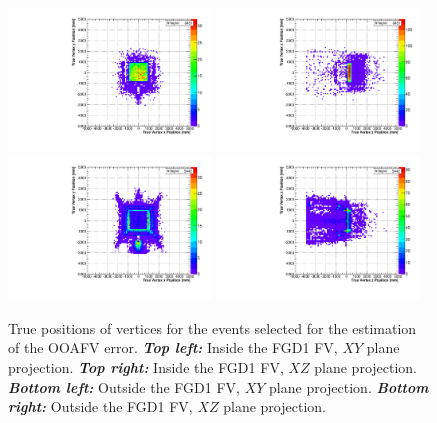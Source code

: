 \begin{figure}[ht]
  \center
  \includegraphics[width=0.48\textwidth]{T2K-TN-313/images/systematics/xy_infv_true.pdf}
  \includegraphics[width=0.48\textwidth]{T2K-TN-313/images/systematics/xz_infv_true.pdf} \\
  \includegraphics[width=0.48\textwidth]{T2K-TN-313/images/systematics/xy_oofv_true.pdf}
  \includegraphics[width=0.48\textwidth]{T2K-TN-313/images/systematics/xz_oofv_true.pdf} \\
  \caption[True positions of the events selected for the estimation of the OOAFV error]{True
    positions of vertices for the events selected for the estimation of the \Gls{OOAFV} error.
    \textbf{\textit{Top left:}} Inside the \Gls{FGD}1 \Gls{FV}, $XY$ plane projection.
    \textbf{\textit{Top right:}} Inside the \Gls{FGD}1 \Gls{FV}, $XZ$ plane projection.
    \textbf{\textit{Bottom left:}} Outside the \Gls{FGD}1 \Gls{FV}, $XY$ plane projection.
    \textbf{\textit{Bottom right:}} Outside the \Gls{FGD}1 \Gls{FV}, $XZ$ plane projection.
  }
  \label{fig:oofvcontrolsampletrue}
\end{figure}

